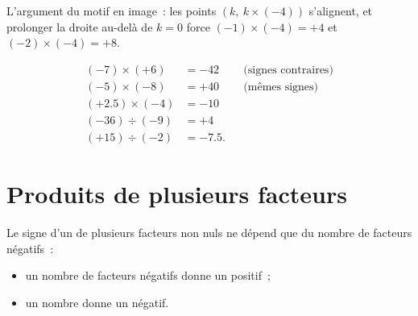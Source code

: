 \begin{omfigure}

{\small L'argument du motif en image~: les points
$(k,\ k \times (-4))$ s'alignent, et prolonger la droite au-delà de
$k = 0$ force $(-1)\times(-4) = +4$ et $(-2)\times(-4) = +8$.}
\end{omfigure}

\begin{example}\label{ex:g8:negprod:products}
\begin{align*}
(-7) \times (+6) &= -42 && \text{(signes contraires)} \\
(-5) \times (-8) &= +40 && \text{(mêmes signes)} \\
(+2.5) \times (-4) &= -10 \\
(-36) \div (-9) &= +4 \\
(+15) \div (-2) &= -7.5 .
\end{align*}
\end{example}

\section{Produits de plusieurs facteurs}

\begin{proposition}\label{prop:g8:negprod:many}
Le signe d'un  de plusieurs facteurs non nuls ne dépend que du
nombre de facteurs négatifs~:
\begin{itemize}
  \item un nombre \emph{} de facteurs négatifs donne un 
        positif~;
  \item un nombre \emph{} donne un  négatif.
\end{itemize}
\end{proposition}

